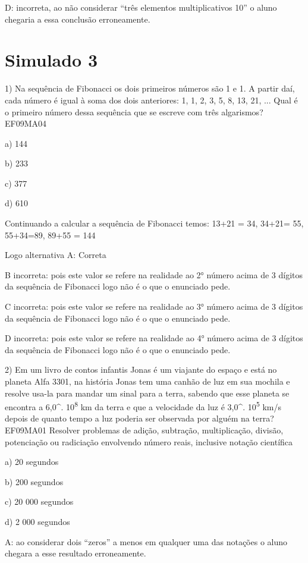 D: incorreta, ao não considerar ``três elementos multiplicativos 10'' o
aluno chegaria a essa conclusão erroneamente.

\section{Simulado 3}

1) Na sequência de Fibonacci os dois primeiros números são 1 e 1. A
partir daí, cada número é igual à soma dos dois anteriores: 1, 1, 2, 3,
5, 8, 13, 21, ... Qual é o primeiro número dessa sequência que se
escreve com três algarismos? EF09MA04

a) 144

b) 233

c) 377

d) 610

Continuando a calcular a sequência de Fibonacci temos: 13+21 = 34,
34+21= 55, 55+34=89, 89+55 = 144

Logo alternativa A: Correta

B incorreta: pois este valor se refere na realidade ao 2° número acima
de 3 dígitos da sequência de Fibonacci logo não é o que o enunciado
pede.

C incorreta: pois este valor se refere na realidade ao 3° número acima
de 3 dígitos da sequência de Fibonacci logo não é o que o enunciado
pede.

D incorreta: pois este valor se refere na realidade ao 4° número acima
de 3 dígitos da sequência de Fibonacci logo não é o que o enunciado
pede.

2) Em um livro de contos infantis Jonas é um viajante do espaço e está
no planeta Alfa 3301, na história Jonas tem uma canhão de luz em sua
mochila e resolve usa-la para mandar um sinal para a terra, sabendo que
esse planeta se encontra a 6,0^{.} 10\textsuperscript{8}
km da terra e que a velocidade da luz é 3,0^{.}
10\textsuperscript{5} km/s depois de quanto tempo a luz poderia ser
observada por alguém na terra? EF09MA01 Resolver problemas de adição,
subtração, multiplicação, divisão, potenciação ou radiciação envolvendo
número reais, inclusive notação científica

a) 20 segundos

b) 200 segundos

c) 20 000 segundos

d) 2 000 segundos

A: ao considerar dois ``zeros'' a menos em qualquer uma das notações o
aluno chegara a esse resultado erroneamente.

